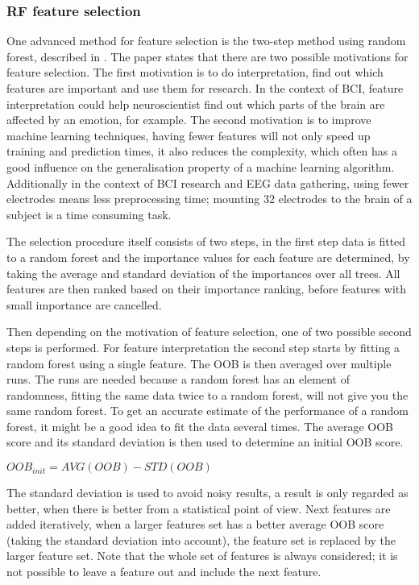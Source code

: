 \subsubsection{RF feature selection}
One advanced method for feature selection is the two-step method using random forest, described in \citep{rfPaper}. The paper states that there are two possible motivations for feature selection. The first motivation is to do interpretation, find out which features are important and use them for research. In the context of BCI, feature interpretation could help neuroscientist find out which parts of the brain are affected by an emotion, for example. The second motivation is to improve machine learning techniques, having fewer features will not only speed up training and prediction times, it also reduces the complexity, which often has a good influence on the generalisation property of a machine learning algorithm. Additionally in the context of BCI research and EEG data gathering, using fewer electrodes means less preprocessing time; mounting 32 electrodes to the brain of a subject is a time consuming task.

\npar

The selection procedure itself consists of two steps, in the first step data is fitted to a random forest and the importance values for each feature are determined, by taking the average and standard deviation of the importances over all trees. All features are then ranked based on their importance ranking, before features with small importance are cancelled. 

\npar

Then depending on the motivation of feature selection, one of two possible second steps is performed. For feature interpretation the second step starts by fitting a random forest using a single feature. The OOB is then averaged over multiple runs. The runs are needed because a random forest has an element of randomness, fitting the same data twice to a random forest, will not give you the same random forest. To get an accurate estimate of the performance of a random forest, it might be a good idea to fit the data several times. The average OOB score and its standard deviation is then used to determine an initial OOB score.

\begin{center}
$OOB_{init} = AVG(OOB) - STD(OOB)$
\end{center}

The standard deviation is used to avoid noisy results, a result is only regarded as better, when there is better from a statistical point of view. Next features are added iteratively, when a larger features set has a better average OOB score (taking the standard deviation into account), the feature set is replaced by the larger feature set. Note that the whole set of features is always considered; it is not possible to leave a feature out and include the next feature.

